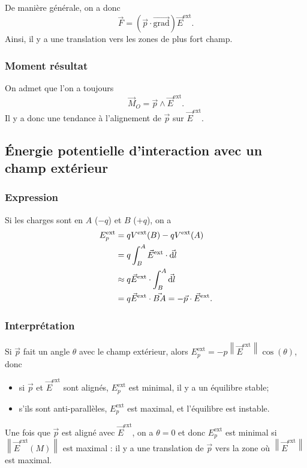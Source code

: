 De manière générale, on a donc
\begin{equation}
    \boxed{
        \vec{F}=\left(\vec{p}\cdot\vec{\mathrm{grad}}\right)\vec{E}^{\mathrm{ext}}.
    }
\end{equation}
Ainsi, il y a une translation vers les zones de plus fort champ.

\subsubsection{Moment résultat}

On admet que l'on a toujours
\begin{equation}
    \boxed{
        \vec{M}_O=\vec{p}\wedge\vec{E}^{\mathrm{ext}}.
    }
\end{equation}
Il y a donc une tendance à l'alignement de $\vec{p}$ sur $\vec{E}^{\mathrm{ext}}$.

\subsection{Énergie potentielle d'interaction avec un champ extérieur}
\subsubsection{Expression}
Si les charges sont en $A$ ($-q$) et $B$ ($+q$), on a 
\begin{align}
    E_{p}^{\mathrm{ext}}
    &=
    qV^{\mathrm{ext}}(B)-qV^{\mathrm{ext}}(A)\\
    &=
    q\int_{B}^{A}\vec{E}^{\mathrm{ext}}\cdot\vec{\mathrm{d} l}\\
    &
    \approx q\vec{E}^{\mathrm{ext}}\cdot\int_{B}^{A}\vec{\mathrm{d} l}\\
    &=
    q\vec{E}^{\mathrm{ext}}\cdot\vec{BA}=-\vec{p}\cdot\vec{E}^{\mathrm{ext}}.
\end{align}

\subsubsection{Interprétation}

Si $\vec{p}$ fait un angle $\theta$ avec le champ extérieur, alors $E_p^{\mathrm{ext}}=-p\left\lVert\vec{E}^{\mathrm{ext}}\right\rVert\cos(\theta)$, donc
\begin{itemize}
    \item si $\vec{p}$ et $\vec{E}^{\mathrm{ext}}$ sont alignés, $E_p^{\mathrm{ext}}$ est minimal, il y a un équilibre stable;
    \item s'ils sont anti-parallèles, $E_p^{\mathrm{ext}}$ est maximal, et l'équilibre est instable.
\end{itemize}

Une fois que $\vec{p}$ est aligné avec $\vec{E}^{\mathrm{ext}}$, on a $\theta=0$ et donc $E_p^{\mathrm{ext}}$ est minimal si $\left\lVert\vec{E}^{\mathrm{ext}}(M)\right\rVert$ est maximal : il y a une translation de $\vec{p}$ vers la zone où $\left\lVert \vec{E}^{\mathrm{ext}}\right\rVert$ est maximal.